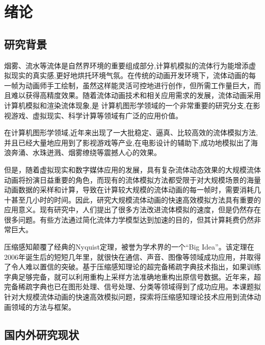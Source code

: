 
\chapter{绪论}
\label{chap:background}

\section{研究背景}

烟雾、流水等流体是自然界环境的重要组成部分,计算机模拟的流体行为能增添虚拟现实的真实感,更好地烘托环境气氛。在传统的动画开发环境下，流体动画的每一帧为动画师手工绘制，虽然这样能灵活可控地进行创作，但所需工作量巨大，而且难以获得高精度效果。随着流体动画技术和相关应用需求的发展，流体动画采用计算机模拟和渲染流体现象,是 计算机图形学领域的一个非常重要的研究分支,在影视游戏、虚拟现实、科学计算等领域有广泛的应用价值。

在计算机图形学领域,近年来出现了一大批稳定、逼真、比较高效的流体模拟方法,并且已经大量地应用到了影视游戏等产业,在电影设计的辅助下,成功地模拟出了海浪奔涌、水珠迸溅、烟雾缭绕等震撼人心的效果。

但是，随着虚拟现实和数字媒体应用的发展，具有复杂流体动态效果的大规模流体动画将扮演日益重要的角色，而现有的流体模拟方法都受限于对大规模场景的海量动画数据的采样和计算，导致在计算较大规模的流体动画的每一帧时，需要消耗几十甚至几小时的时间。因此，研究大规模流体动画的快速高效模拟方法具有重要的应用意义。现有研究中，人们提出了很多方法改进流体模拟的速度，但是仍然存在很多问题。有些方法通过简化流体力学模型达到加速的目的，但其计算耗费仍然非常巨大。

压缩感知颠覆了经典的Nyquist定理，被誉为学术界的一个“Big Idea''。该定理在2006年诞生后的短短几年里，就很快在通信、声音、图像等领域成功应用，并取得了令人难以置信的突破。基于压缩感知理论的超完备稀疏字典技术指出，如果训练字典足够完备，就可以利用重构上采样方法准确地重构出原信号数据。近年来，超完备稀疏字典也已在图形处理、信号处理、分类等领域得到了成功应用。本课题拟针对大规模流体动画的快速高效模拟问题，探索将压缩感知理论技术应用到流体动画领域的方法与框架。

\section{国内外研究现状}
